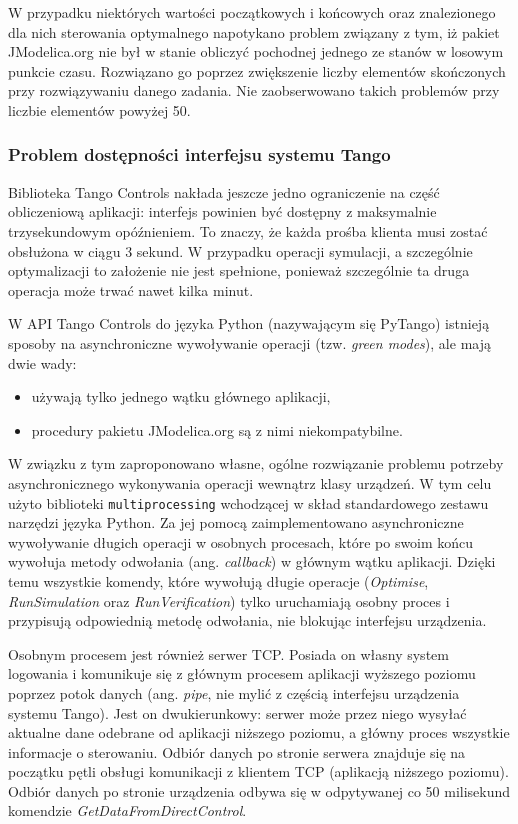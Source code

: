 W przypadku niektórych wartości początkowych i końcowych oraz znalezionego dla nich sterowania optymalnego napotykano problem związany z tym, iż pakiet JModelica.org nie był w stanie obliczyć pochodnej jednego ze stanów w losowym punkcie czasu. Rozwiązano go poprzez zwiększenie liczby elementów skończonych przy rozwiązywaniu danego zadania. Nie zaobserwowano takich problemów przy liczbie elementów powyżej 50.

\subsubsection{Problem dostępności interfejsu systemu Tango}

Biblioteka Tango Controls nakłada jeszcze jedno ograniczenie na część obliczeniową aplikacji: interfejs powinien być dostępny z maksymalnie trzysekundowym opóźnieniem. To znaczy, że każda prośba klienta musi zostać obsłużona w ciągu 3 sekund. W przypadku operacji symulacji, a szczególnie optymalizacji to założenie nie jest spełnione, ponieważ szczególnie ta druga operacja może trwać nawet kilka minut.

W API Tango Controls do języka Python (nazywającym się PyTango) istnieją sposoby na asynchroniczne wywoływanie operacji (tzw. \emph{green modes}), ale mają dwie wady:
\begin{itemize}
    \item używają tylko jednego wątku głównego aplikacji,
    \item procedury pakietu JModelica.org są z nimi niekompatybilne.
\end{itemize}

W związku z tym zaproponowano własne, ogólne rozwiązanie problemu potrzeby asynchronicznego wykonywania operacji wewnątrz klasy urządzeń. W tym celu użyto biblioteki \texttt{multiprocessing} wchodzącej w skład standardowego zestawu narzędzi języka Python. Za jej pomocą zaimplementowano asynchroniczne wywoływanie długich operacji w osobnych procesach, które po swoim końcu wywołuja metody odwołania (ang. \emph{callback}) w głównym wątku aplikacji. Dzięki temu wszystkie komendy, które wywołują długie operacje (\emph{Optimise}, \emph{RunSimulation} oraz \emph{RunVerification}) tylko uruchamiają osobny proces i przypisują odpowiednią metodę odwołania, nie blokując interfejsu urządzenia.

Osobnym procesem jest również serwer TCP. Posiada on własny system logowania i komunikuje się z głównym procesem aplikacji wyższego poziomu poprzez potok danych (ang. \emph{pipe}, nie mylić z częścią interfejsu urządzenia systemu Tango). Jest on dwukierunkowy: serwer może przez niego wysyłać aktualne dane odebrane od aplikacji niższego poziomu, a główny proces wszystkie informacje o sterowaniu. Odbiór danych po stronie serwera znajduje się na początku pętli obsługi komunikacji z klientem TCP (aplikacją niższego poziomu). Odbiór danych po stronie urządzenia odbywa się w odpytywanej co 50 milisekund komendzie \emph{GetDataFromDirectControl}.

